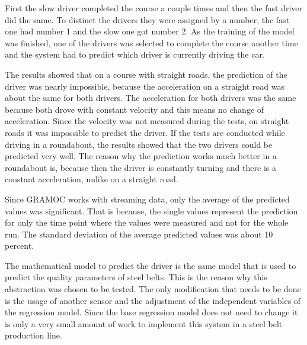 First the slow driver completed the course a couple times and then the fast driver did the same. To distinct the drivers they were assigned by a number, the fast one had number 1 and the slow one got number 2. As the training of the model was finished, one of the drivers was selected to complete the course another time and the system had to predict which driver is currently driving the car.

The results showed that on a course with straight roads, the prediction of the driver was nearly impossible, because the acceleration on a straight road was about the same for both drivers. The acceleration for both drivers was the same because both drove with constant velocity and this means no change of acceleration. Since the velocity was not measured during the tests, on straight roads it was impossible to predict the driver. If the tests are conducted while driving in a roundabout, the results showed that the two drivers could be predicted very well. The reason why the prediction works much better in a roundabout is, because then the driver is constantly turning and there is a constant acceleration, unlike on a straight road.

Since GRAMOC works with streaming data, only the average of the predicted values was significant. That is because, the single values represent the prediction for only the time point where the values were measured and not for the whole run. The standard deviation of the average predicted values was about 10 percent.

The mathematical model to predict the driver is the same model that is used to predict the quality parameters of steel belts. This is the reason why this abstraction was chosen to be tested. The only modification that needs to be done is the usage of another sensor and the adjustment of the independent variables of the regression model. Since the base regression model does not need to change it is only a very small amount of work to implement this system in a steel belt production line.

